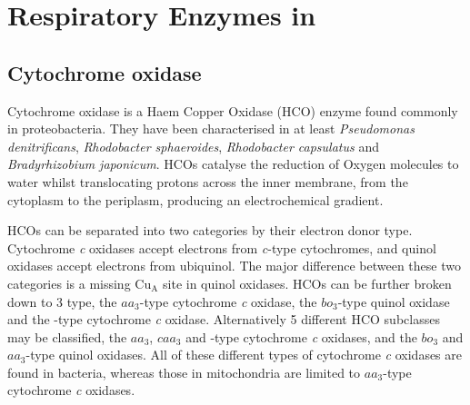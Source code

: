 \section{Respiratory Enzymes in \Nm{}}
\subsection{\texorpdfstring{Cytochrome \cbbthree{} oxidase}{Cytochrome cbb3 oxidase}}
Cytochrome \cbbthree{} oxidase is a Haem Copper Oxidase (HCO) enzyme found commonly in proteobacteria. They have been characterised in at least \textit{Pseudomonas denitrificans}, \textit{Rhodobacter sphaeroides}, \textit{Rhodobacter capsulatus} and \textit{Bradyrhizobium japonicum}\cite{Pitcher2004}. HCOs catalyse the reduction of Oxygen molecules to water whilst translocating protons across the inner membrane, from the cytoplasm to the periplasm, producing an electrochemical gradient.

HCOs can be separated into two categories by their electron donor type. Cytochrome \textit{c} oxidases accept electrons from \textit{c}-type cytochromes, and quinol oxidases accept electrons from ubiquinol. The major difference between these two categories is a missing $\mathrm{Cu}_\mathrm{A}$ site in quinol oxidases\cite{Puustinen1996}. HCOs can be further broken down to 3 type, the $\mathit{aa}_3$-type cytochrome \textit{c} oxidase, the $\mathit{bo}_3$-type quinol oxidase and the \cbbthree{}-type cytochrome \textit{c} oxidase\cite{vanderOost1994}. Alternatively 5 different HCO subclasses may be classified, the $\mathit{aa}_3$, $\mathit{caa}_3$ and \cbbthree{}-type cytochrome \textit{c} oxidases, and the $\mathit{bo}_3$ and $\mathit{aa}_3$-type quinol oxidases\cite{Garcia-Horsman1994}. All of these different types of cytochrome \textit{c} oxidases are found in bacteria, whereas those in mitochondria are limited to $\mathit{aa}_3$-type cytochrome \textit{c} oxidases\cite{Keilin1939}.

